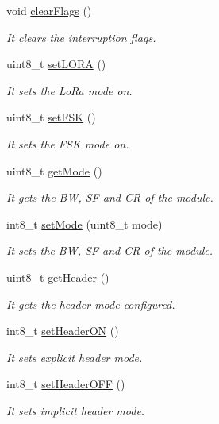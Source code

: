 \begin{DoxyCompactItemize}
void \hyperlink{class_wasp_s_x1272_a79ed7e936a231836bbba73c432490502}{clear\+Flags} ()
\begin{DoxyCompactList}\small\item\em It clears the interruption flags. \end{DoxyCompactList}\item 
uint8\+\_\+t \hyperlink{class_wasp_s_x1272_a5789e7501f0644ae3cd5aa74224a4b9b}{set\+L\+O\+RA} ()
\begin{DoxyCompactList}\small\item\em It sets the Lo\+Ra mode on. \end{DoxyCompactList}\item 
uint8\+\_\+t \hyperlink{class_wasp_s_x1272_a2b10fc7aa684df80b9e20ae7aec3b53f}{set\+F\+SK} ()
\begin{DoxyCompactList}\small\item\em It sets the F\+SK mode on. \end{DoxyCompactList}\item 
uint8\+\_\+t \hyperlink{class_wasp_s_x1272_a6768cfb86570b1c9cab31cb814935a6b}{get\+Mode} ()
\begin{DoxyCompactList}\small\item\em It gets the BW, SF and CR of the module. \end{DoxyCompactList}\item 
int8\+\_\+t \hyperlink{class_wasp_s_x1272_a3d21215daa95c054fbad20d4b9c584b9}{set\+Mode} (uint8\+\_\+t mode)
\begin{DoxyCompactList}\small\item\em It sets the BW, SF and CR of the module. \end{DoxyCompactList}\item 
uint8\+\_\+t \hyperlink{class_wasp_s_x1272_aa8524235c5dae92706f9f17b6ad50ec9}{get\+Header} ()
\begin{DoxyCompactList}\small\item\em It gets the header mode configured. \end{DoxyCompactList}\item 
int8\+\_\+t \hyperlink{class_wasp_s_x1272_a1394f68ba9aa38a080d97413918f2c5d}{set\+Header\+ON} ()
\begin{DoxyCompactList}\small\item\em It sets explicit header mode. \end{DoxyCompactList}\item 
int8\+\_\+t \hyperlink{class_wasp_s_x1272_a5b36510ae511b68be945ade593059fdc}{set\+Header\+O\+FF} ()
\begin{DoxyCompactList}\small\item\em It sets implicit header mode. \end{DoxyCompactList}\item 

\end{DoxyCompactItemize}
